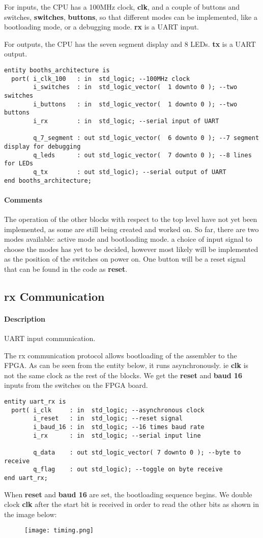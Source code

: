 \documentclass[a4paper]{article}
\begin{document}
For inputs, the CPU has a 100MHz clock, \textbf{clk}, and a couple of buttons and switches, \textbf{switches}, \textbf{buttons}, so that different modes can be implemented, like a bootloading mode, or a debugging mode. \textbf{rx} is a UART input.

For outputs, the CPU has the seven segment display and 8 LEDs. \textbf{tx} is a UART output.
\begin{verbatim}
entity booths_architecture is
  port( i_clk_100   : in  std_logic; --100MHz clock
        i_switches  : in  std_logic_vector(  1 downto 0 ); --two switches
        i_buttons   : in  std_logic_vector(  1 downto 0 ); --two buttons
        i_rx        : in  std_logic; --serial input of UART

        q_7_segment : out std_logic_vector(  6 downto 0 ); --7 segment display for debugging
        q_leds      : out std_logic_vector(  7 downto 0 ); --8 lines for LEDs
        q_tx        : out std_logic); --serial output of UART
end booths_architecture;
\end{verbatim}
\paragraph{Comments}
The operation of the other blocks with respect to the top level have not yet been implemented, as some are still being created and worked on. So far, there are two modes available: active mode and bootloading mode. a choice of input signal to choose the modes has yet to be decided, however most likely will be implemented as the position of the switches on power on. One button will be a reset signal that can be found in the code as \textbf{reset}.
\subsection{rx Communication}
\paragraph{Description}
UART input communication.

The rx communication protocol allows bootloading of the assembler to the FPGA. As can be seen from the entity below, it runs asynchronously. ie \textbf{clk} is not the same clock as the rest of the blocks. We get the \textbf{reset} and \textbf{baud 16} inputs from the switches on the FPGA board.
\begin{verbatim}
entity uart_rx is
  port( i_clk     : in  std_logic; --asynchronous clock
        i_reset   : in  std_logic; --reset signal
        i_baud_16 : in  std_logic; --16 times baud rate
        i_rx      : in  std_logic; --serial input line

        q_data    : out std_logic_vector( 7 downto 0 ); --byte to receive
        q_flag    : out std_logic); --toggle on byte receive
end uart_rx;
\end{verbatim}
When \textbf{reset} and \textbf{baud 16} are set, the bootloading sequence begins. We double clock \textbf{clk} after the start bit is received in order to read the other bits as shown in the image below:

\begin{figure}[h]
\texttt{[image: timing.png]}
\end{figure}

\begin{verbatim}
	
\end{verbatim}
\end{document}
